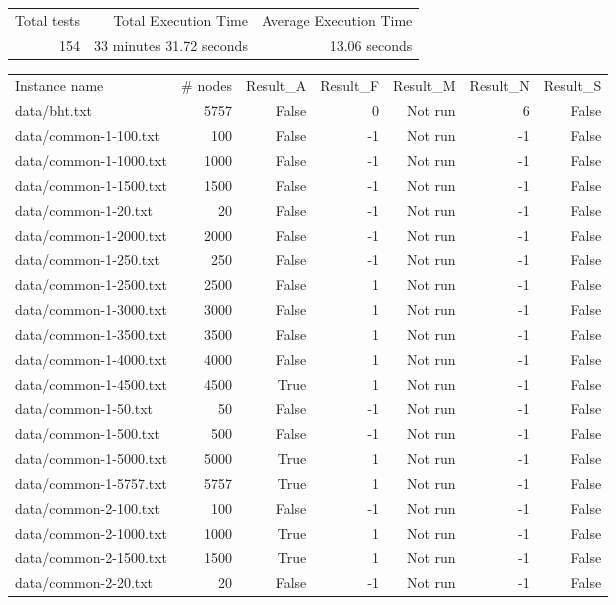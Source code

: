 \begin{tabular}{rrr}
Total tests & Total Execution Time & Average Execution Time \\
154 & 33 minutes 31.72 seconds & 13.06 seconds \\
\end{tabular}
\begin{tabular}{lrrrrrr}
Instance name & # nodes & Result_A & Result_F & Result_M & Result_N & Result_S \\
data/bht.txt & 5757 & False & 0 & Not run & 6 & False \\
data/common-1-100.txt & 100 & False & -1 & Not run & -1 & False \\
data/common-1-1000.txt & 1000 & False & -1 & Not run & -1 & False \\
data/common-1-1500.txt & 1500 & False & -1 & Not run & -1 & False \\
data/common-1-20.txt & 20 & False & -1 & Not run & -1 & False \\
data/common-1-2000.txt & 2000 & False & -1 & Not run & -1 & False \\
data/common-1-250.txt & 250 & False & -1 & Not run & -1 & False \\
data/common-1-2500.txt & 2500 & False & 1 & Not run & -1 & False \\
data/common-1-3000.txt & 3000 & False & 1 & Not run & -1 & False \\
data/common-1-3500.txt & 3500 & False & 1 & Not run & -1 & False \\
data/common-1-4000.txt & 4000 & False & 1 & Not run & -1 & False \\
data/common-1-4500.txt & 4500 & True & 1 & Not run & -1 & False \\
data/common-1-50.txt & 50 & False & -1 & Not run & -1 & False \\
data/common-1-500.txt & 500 & False & -1 & Not run & -1 & False \\
data/common-1-5000.txt & 5000 & True & 1 & Not run & -1 & False \\
data/common-1-5757.txt & 5757 & True & 1 & Not run & -1 & False \\
data/common-2-100.txt & 100 & False & -1 & Not run & -1 & False \\
data/common-2-1000.txt & 1000 & True & 1 & Not run & -1 & False \\
data/common-2-1500.txt & 1500 & True & 1 & Not run & -1 & False \\
data/common-2-20.txt & 20 & False & -1 & Not run & -1 & False \\

\end{tabular}
